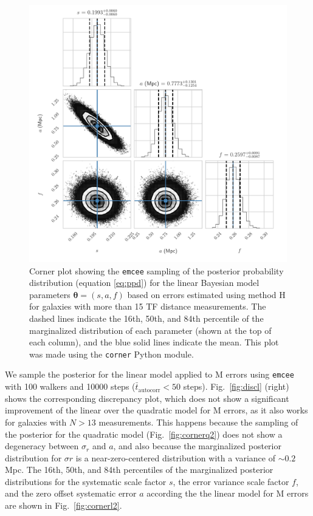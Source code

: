 \documentclass[a4paper,fleqn,usenatbib]{mnras}
\begin{document}
\begin{figure}
	\includegraphics[scale=0.69]{cornerl}
    \caption{Corner plot showing the \texttt{emcee} sampling of the posterior probability distribution (equation \ref{eq:ppd}) for the linear Bayesian model parameters $\pmb{\theta}=(s,a,f)$ based on errors estimated using method H for galaxies with more than 15 TF distance measurements. The dashed lines indicate the 16th, 50th, and 84th percentile of the marginalized distribution of each parameter (shown at the top of each column), and the blue solid lines indicate the mean. This plot was made using the \texttt{corner} Python module.}
    \label{fig:cornerl}
\end{figure}
We sample the posterior for the linear model applied to M errors using \texttt{emcee} with 100 walkers and 10000 steps ($\bar{t}_\mathrm{autocorr} < 50$ steps). Fig.~\ref{fig:discl} (right) shows the corresponding discrepancy plot, which does not show a significant improvement of the linear over the quadratic model for M errors, as it also works for galaxies with $N>13$ measurements. This happens because the sampling of the posterior for the quadratic model (Fig.~\ref{fig:cornerq2}) does not show a degeneracy between $\sigma_r$ and $a$, and also because the marginalized posterior distribution for $\sigma r$ is a near-zero-centered distribution with a variance of $\sim0.2$ Mpc. The 16th, 50th, and 84th percentiles of the marginalized posterior distributions for the systematic scale factor $s$, the error variance scale factor $f$, and the zero offset systematic error $a$ according the the linear model for M errors are shown in Fig.~\ref{fig:cornerl2}. 
\end{document}
